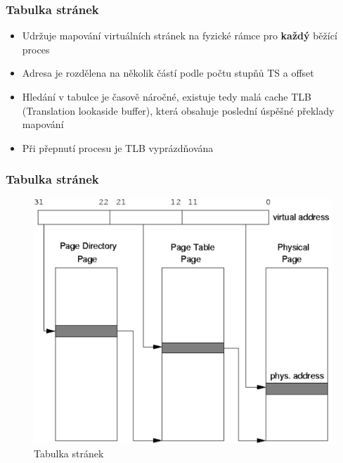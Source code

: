 \documentclass[professionalfonts,svgnames]{beamer}
\begin{document}
 \begin{frame}
\frametitle{Tabulka stránek}
\begin{itemize}
\item Udržuje mapování virtuálních stránek na fyzické rámce pro \textbf{každý} běžící proces
\item Adresa je rozdělena na několik částí podle počtu stupňů TS a offset
\item Hledání v tabulce je časově náročné, existuje tedy malá cache TLB (Translation lookaside buffer), která obsahuje poslední úspěšné překlady mapování
\item Při přepnutí procesu je TLB vyprázdňována
\end{itemize}
\end{frame}

\begin{frame}
\frametitle{Tabulka stránek}
\begin{figure}[h]
	\includegraphics[scale=0.4]{fig/pgtable}
	\caption{Tabulka stránek}
	\label{vm}
\end{figure}
\end{frame}
\end{document}
